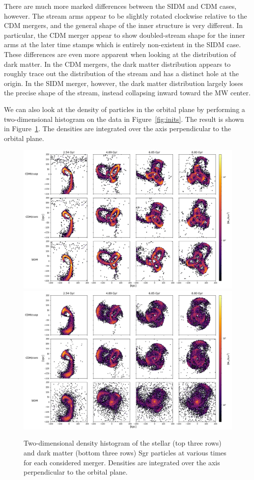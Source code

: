 There are much more marked differences between the SIDM and CDM cases,
however.  The stream arms appear to be slightly rotated clockwise relative to
the CDM mergers, and the general shape of the inner structure is very
different.  In particular, the CDM merger appear to show doubled-stream shape
for the inner arms at the later time stamps which is entirely non-existent in
the SIDM case.  These differences are even more apparent when looking at the
distribution of dark matter.  In the CDM mergers, the dark matter distribution
appears to roughly trace out the distribution of the stream and has a distinct
hole at the origin.  In the SIDM merger, however, the dark matter distribution
largely loses the precise shape of the stream, instead collapsing inward
toward the MW center.

We can also look at the density of particles in the orbital plane by performing
a two-dimensional histogram on the data in Figure~\ref{fig:inits}.  The result
is shown in Figure~\ref{fig:densities}.  The densities are integrated over the
axis perpendicular to the orbital plane.

\begin{figure}
    \centering
    \includegraphics[width=0.9\linewidth]{figs/density_stars.png}
    \includegraphics[width=0.9\linewidth]{figs/density_darks.png}
    \caption{%
        Two-dimensional density histogram of the stellar (top three rows) and
        dark matter (bottom three rows) Sgr particles at various times for
        each considered merger.  Densities are integrated over the axis
        perpendicular to the orbital plane.
    }
    \label{fig:densities}
\end{figure}

